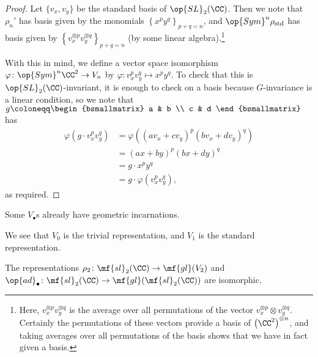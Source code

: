 \documentclass[../notes.tex]{subfiles}
\begin{document}
\begin{proof}
	Let $\{v_x,v_y\}$ be the standard basis of $\op{SL}_2(\CC)$. Then we note that $\rho_n'$ has basis given by the monomials $\left\{x^py^q\right\}_{p+q=n}$, and $\op{Sym}^n\rho_{\mathrm{std}}$ has basis given by $\left\{v_x^{\otimes p}v_y^{\otimes q}\right\}_{p+q=n}$ (by some linear algebra).\footnote{Here, $v_x^{\otimes p}v_y^{\otimes q}$ is the average over all permutations of the vector $v_x^{\otimes p}\otimes v_y^{\otimes q}$. Certainly the permutations of these vectors provide a basis of $\left(\CC^2\right)^{\otimes n}$, and taking averages over all permutations of the basis shows that we have in fact given a basis.}
	
	With this in mind, we define a vector space isomorphism $\varphi\colon\op{Sym}^n\CC^2\to V_n$ by $\varphi\colon v_x^pv_y^q\mapsto x^py^q$. To check that this is $\op{SL}_2(\CC)$-invariant, it is enough to check on a basis because $G$-invariance is a linear condition, so we note that $g\coloneqq\begin{bsmallmatrix}
		a & b \\ c & d
	\end{bsmallmatrix}$ has
	\begin{align*}
		\varphi\left(g\cdot v_x^pv_y^q\right) &= \varphi\left((av_x+cv_y)^p(bv_x+dv_y)^q\right) \\
		&= (ax+by)^p(bx+dy)^q \\
		&= g\cdot x^py^q \\
		&= g\cdot\varphi\left(v_x^pv_y^q\right),
	\end{align*}
	as required.
\end{proof}
Some $V_\bullet$s already have geometric incarnations.
\begin{example}
	We see that $V_0$ is the trivial representation, and $V_1$ is the standard representation.
\end{example}
\begin{lemma}
	The representations $\rho_2\colon\mf{sl}_2(\CC)\to\mf{gl}(V_2)$ and $\op{ad}_\bullet\colon\mf{sl}_2(\CC)\to\mf{gl}(\mf{sl}_2(\CC))$ are isomorphic.
\end{lemma}
\end{document}
